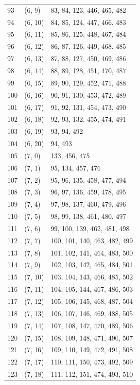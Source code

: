 \documentclass{article}
\begin{document}
\begin{longtable}{lll}
  93 & (6, 9) & 83, 84, 123, 446, 465, 482 \\
  94 & (6, 10) & 84, 85, 124, 447, 466, 483 \\
  95 & (6, 11) & 85, 86, 125, 448, 467, 484 \\
  96 & (6, 12) & 86, 87, 126, 449, 468, 485 \\
  97 & (6, 13) & 87, 88, 127, 450, 469, 486 \\
  98 & (6, 14) & 88, 89, 128, 451, 470, 487 \\
  99 & (6, 15) & 89, 90, 129, 452, 471, 488 \\
  100 & (6, 16) & 90, 91, 130, 453, 472, 489 \\
  101 & (6, 17) & 91, 92, 131, 454, 473, 490 \\
  102 & (6, 18) & 92, 93, 132, 455, 474, 491 \\
  103 & (6, 19) & 93, 94, 492 \\
  104 & (6, 20) & 94, 493 \\
  105 & (7, 0) & 133, 456, 475 \\
  106 & (7, 1) & 95, 134, 457, 476 \\
  107 & (7, 2) & 95, 96, 135, 458, 477, 494 \\
  108 & (7, 3) & 96, 97, 136, 459, 478, 495 \\
  109 & (7, 4) & 97, 98, 137, 460, 479, 496 \\
  110 & (7, 5) & 98, 99, 138, 461, 480, 497 \\
  111 & (7, 6) & 99, 100, 139, 462, 481, 498 \\
  112 & (7, 7) & 100, 101, 140, 463, 482, 499 \\
  113 & (7, 8) & 101, 102, 141, 464, 483, 500 \\
  114 & (7, 9) & 102, 103, 142, 465, 484, 501 \\
  115 & (7, 10) & 103, 104, 143, 466, 485, 502 \\
  116 & (7, 11) & 104, 105, 144, 467, 486, 503 \\
  117 & (7, 12) & 105, 106, 145, 468, 487, 504 \\
  118 & (7, 13) & 106, 107, 146, 469, 488, 505 \\
  119 & (7, 14) & 107, 108, 147, 470, 489, 506 \\
  120 & (7, 15) & 108, 109, 148, 471, 490, 507 \\
  121 & (7, 16) & 109, 110, 149, 472, 491, 508 \\
  122 & (7, 17) & 110, 111, 150, 473, 492, 509 \\
  123 & (7, 18) & 111, 112, 151, 474, 493, 510 \\

\end{longtable}
\end{document}
